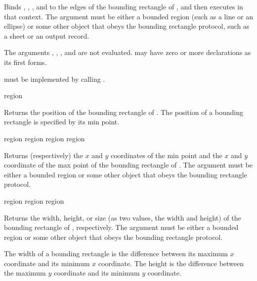 Binds , , , and  to the edges of the
bounding rectangle of , and then executes  in that
context.  The argument  must be either a bounded region (such as a
line or an ellipse) or some other object that obeys the bounding rectangle
protocol, such as a sheet or an output record.

The arguments , , , and  are not
evaluated.   may have zero or more declarations as its first forms.

 must be implemented by calling .


 {region}

Returns the position of the bounding rectangle of .  The position of
a bounding rectangle is specified by its min point.


 {region}
 {region}
 {region}
 {region}

Returns (respectively) the $x$ and $y$ coordinates of the min point and the $x$
and $y$ coordinate of the max point of the bounding rectangle of .
The argument  must be either a bounded region or some other object
that obeys the bounding rectangle protocol.


  {region}
 {region}
   {region}

Returns the width, height, or size (as two values, the width and height) of the
bounding rectangle of , respectively.  The argument 
must be either a bounded region or some other object that obeys the bounding
rectangle protocol.

The width of a bounding rectangle is the difference between its maximum $x$
coordinate and its minimum $x$ coordinate.  The height is the difference between
the maximum $y$ coordinate and its minimum $y$ coordinate.
